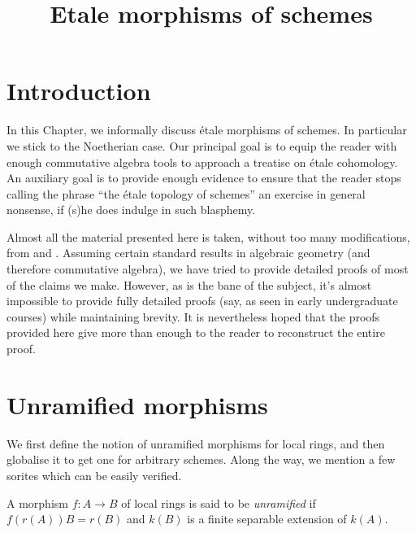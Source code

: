 

%


\title{Etale morphisms of schemes}

\maketitle

\tableofcontents



\section{Introduction}
\label{section-introduction}

\noindent
In this Chapter, we informally discuss \'etale morphisms of schemes.
In particular we stick to the Noetherian case.
Our principal goal is to equip the reader with enough commutative algebra
tools to approach a treatise on \'etale cohomology. An auxiliary goal is to
provide enough evidence to ensure that the reader stops calling the phrase
``the \'etale topology of schemes'' an exercise in general nonsense, if (s)he
does indulge in such blasphemy. 

\medskip\noindent
Almost all the material presented here is taken, without too many
modifications, from \cite{SGA1} and \cite{Ner}. Assuming certain standard
results in algebraic geometry (and therefore commutative algebra), we have
tried to provide detailed proofs of most of the claims we make. However, as is
the bane of the subject, it's almost impossible to provide fully detailed
proofs (say, as seen in early undergraduate courses) while maintaining
brevity. It is nevertheless hoped that the proofs provided here give more than
enough to the reader to reconstruct the entire proof.

\section{Unramified morphisms}
\label{section-unramified-definition}

\noindent
We first define the notion of unramified morphisms for local rings, and then
globalise it to get one for arbitrary schemes. Along the way, we mention a few
sorites which can be easily verified.

\begin{definition}
\label{definition-unramified-rings}
A morphism $f:A \to B$ of local rings is said to be {\it unramified} if
$f(r(A))B = r(B)$ and $k(B)$ is a finite separable extension of $k(A)$. 
\end{definition}

